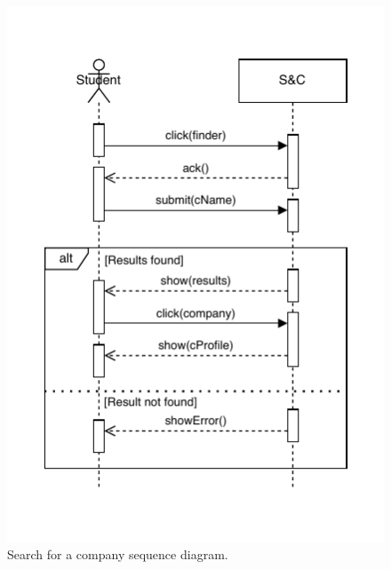\begin{figure}[H]
    \begin{center}
        \includegraphics[width=\linewidth]{Images/SequenceDiagram/SearchCompanySD2.pdf}
        \caption{Search for a company sequence diagram.}
        \label{fig:search_for_a_company_seqdiag}%
    \end{center}
\end{figure}


